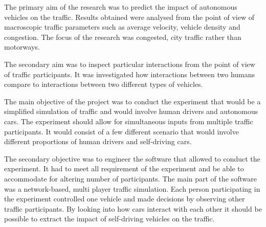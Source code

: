\documentclass[11pt,english]{article}
\begin{document}



\par
The primary aim of the research was to predict the impact of autonomous vehicles on the traffic. Results obtained were analysed from the point of view of macroscopic traffic parameters such as average velocity, vehicle density and congestion. The focus of the research was congested, city traffic rather than motorways.

\par

The secondary aim was to inspect particular interactions from the point of view of traffic participants. It was investigated how interactions between two humans compare to interactions between two different types of vehicles.  


\par

The main objective of the project was to conduct the experiment that would be a simplified simulation of traffic and would involve human drivers and autonomous cars. The experiment should allow for simultaneous inputs from multiple traffic participants. It would consist of a few different scenario that would involve different proportions of human drivers and self-driving cars. 

\par

The secondary objective was to engineer the software that allowed to conduct the experiment. It had to meet all requirement of the experiment and be able to accommodate for altering number of participants. The main part of the software was a network-based, multi player traffic simulation. Each person participating in the experiment controlled one vehicle and made decisions by observing other traffic participants. By looking into how cars interact with each other it should be possible to extract the impact of self-driving vehicles on the traffic.
\end{document}
